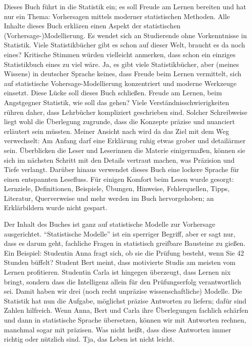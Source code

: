\documentclass[
  a4paper,
]{scrbook}
\theoremstyle{definition}
\theoremstyle{definition}
\theoremstyle{definition}
\theoremstyle{remark}
\begin{document}
Dieses Buch führt in die Statistik ein; es soll Freude am Lernen
bereiten und hat nur ein Thema: Vorhersagen mittels moderner
statistischen Methoden. Alle Inhalte dieses Buch erklären einen Aspekt
der statistischen (Vorhersage-)Modellierung. Es wendet sich an
Studierende ohne Vorkenntnisse in Statistik. Viele Statistikbücher gibt
es schon auf dieser Welt, braucht es da noch eines? Kritische Stimmen
würden vielleicht anmerken, dass schon ein einziges Statistikbuch eines
zu viel wäre. Ja, es gibt viele Statistikbücher, aber (meines Wissens)
in deutscher Sprache keines, dass Freude beim Lernen vermittelt, sich
auf statistische Vohersage-Modellierung konzentriert und moderne
Werkzeuge einsetzt. Diese Lücke soll dieses Buch schließen. Freude am
Lernen, beim Angstgegner Statistik, wie soll das gehen? Viele
Verständnisschwierigkeiten rühren daher, dass Lehrbücher kompliziert
geschrieben sind. Solcher Schreibweise liegt wohl die Überlegung
zugrunde, dass die Konzepte präzise und nuanciert erläutert sein
müssten. Meiner Ansicht nach wird da das Ziel mit dem Weg verwechselt:
Am Anfang darf eine Erklärung ruhig etwas grober und detailärmer sein.
Überblicken die Leser und Leserinnen die Materie einigermaßen, können
sie sich im nächsten Schritt mit den Details vertraut machen, was
Präzision und Tiefe verlangt. Darüber hinaus verwendet dieses Buch eine
lockere Sprache für einen entspannten Lesefluss. Für einigen Komfort
beim Lesen wurde gesorgt: Lernziele, Definitionen, Beispiele, Übungen,
Hinweise, Fehlerquellen, Tipps, Literatur, Querverweise und mehr werden
im Buch hervorgehoben; an Erklärbildern wurde nicht gespart.

Der Inhalt des Buches ist ganz auf statistische Modelle zur Vorhersage
ausgerichtet. ``Statistische Modelle'' ist ein sperriger Begriff, aber
er sagt nur, dass es darum geht, fachliche Fragen in statistisch
greifbare Bausteine zu gießen. Ein Beispiel: Studentin Anna fragt sich,
ob sie die Prüfung besteht, wenn Sie 42 Stunden büffelt? Student Bert
meint, dass motivierte Studis am meisten vom Lernen profitieren.
Studentin Carla ist hingegen überzeugt, dass Lernen nix bringt, sondern
dass die Intelligenz allein für den Prüfungserfolg verantwortlich sei.
Damit haben wir drei (noch recht unpräzise wissenschaftliche) Modelle.
Die Statistik hat nun die Aufgabe, möglichst präzise Antworten zu
liefern; dafür sind Zahlen hilfreich. Wenn Anna, Bert und Carla ihre
Überlegungen fachlich schärfen und dann in statistische Sprache
übersetzen, können wir mit Antworten rechnen, manchmal sogar mit
präzisen. Was nicht heißt, dass diese Antworten immer richtig oder
nützlich sind. Tja, das Leben ist nicht leicht.
\end{document}
